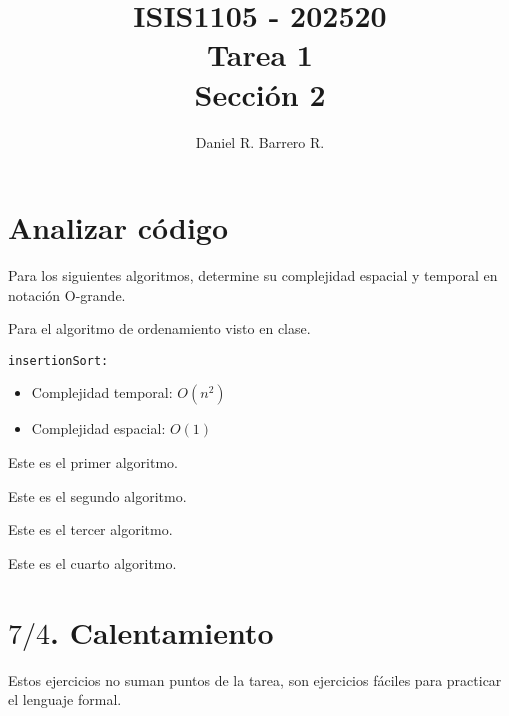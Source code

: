 \documentclass{amsart}
\title{ISIS1105 - 202520 \\ Tarea 1 \\ Sección 2}
\author{Daniel R. Barrero R.}
\begin{document}
\maketitle

\section{Analizar código}

Para los siguientes algoritmos, determine su complejidad espacial y temporal en
notación O-grande.

\begin{ejem*}
	Para el algoritmo de ordenamiento visto en clase.

	\texttt{insertionSort:}
	\begin{itemize}
		\item Complejidad temporal: $O(n^2)$
		\item Complejidad espacial: $O(1)$
	\end{itemize}
\end{ejem*}

\begin{ejer}
	Este es el primer algoritmo.

	
\end{ejer}

\begin{ejer}
	Este es el segundo algoritmo.

	
\end{ejer}

\begin{ejer}
	Este es el tercer algoritmo.

	
\end{ejer}

\begin{ejer}
	Este es el cuarto algoritmo.

	
\end{ejer}

\section*{$7/4$. Calentamiento}

Estos ejercicios no suman puntos de la tarea, son ejercicios fáciles para
practicar el lenguaje formal.
\end{document}
